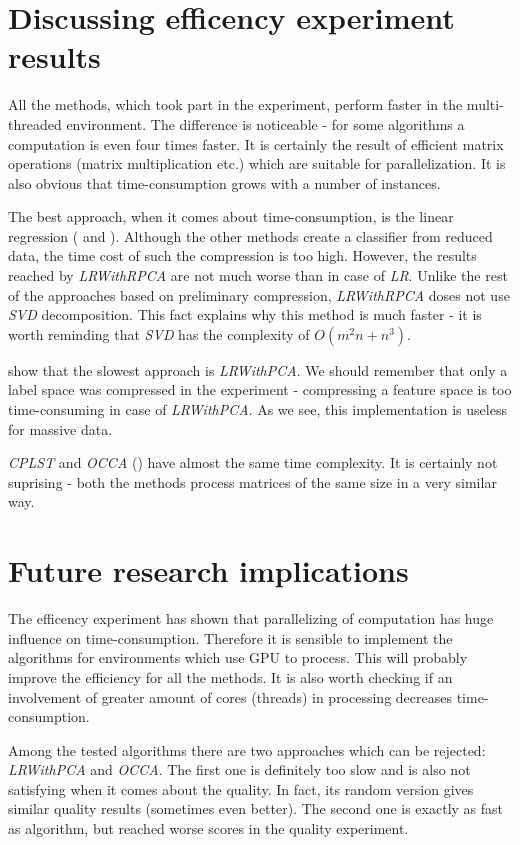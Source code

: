 \section{Discussing efficency experiment results}

All the methods, which took part in the experiment, perform faster in the multi-threaded environment. The difference is noticeable - for some algorithms a computation is even four times faster. It is certainly the result of efficient matrix operations (matrix multiplication etc.) which are suitable for parallelization. It is also obvious that time-consumption grows with a number of instances.

The best approach, when it comes about time-consumption, is the linear regression ( and ). Although the other methods create a classifier from reduced data, the time cost of such the compression is too high. However, the results reached by \textit{LRWithRPCA} are not much worse than in case of \textit{LR}. Unlike the rest of the approaches based on preliminary compression, \textit{LRWithRPCA} doses not use \textit{SVD} decomposition. This fact explains why this method is much faster - it is worth reminding that \textit{SVD} has the complexity of $O(m^2n+n^3)$. 

 show that the slowest approach is \textit{LRWithPCA}. We should remember that only a label space was compressed in the experiment - compressing a feature space is too time-consuming in case of \textit{LRWithPCA}. As we see, this implementation is useless for massive data. 

\textit{CPLST} and \textit{OCCA} () have almost the same time complexity. It is certainly not suprising - both the methods process matrices of the same size in a very similar way.

\section{Future research implications}

The efficency experiment has shown that parallelizing of computation has huge influence on time-consumption. Therefore it is sensible to implement the algorithms for environments which use GPU to process. This will probably improve the efficiency for all the methods. It is also worth checking if an involvement of greater amount of cores (threads) in processing decreases time-consumption.  

Among the tested algorithms there are two approaches which can be rejected: \textit{LRWithPCA} and \textit{OCCA}. The first one is definitely too slow and is also not satisfying when it comes about the quality. In fact, its random version gives similar quality results (sometimes even better). The second one is exactly as fast as  algorithm, but reached worse scores in the quality experiment. 

